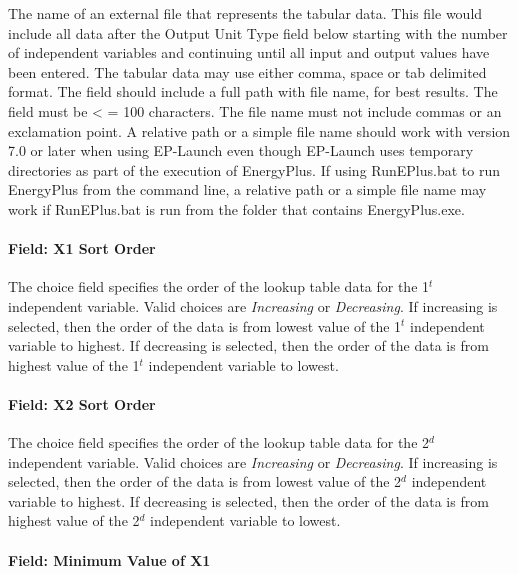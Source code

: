 The name of an external file that represents the tabular data. This file would include all data after the Output Unit Type field below starting with the number of independent variables and continuing until all input and output values have been entered. The tabular data may use either comma, space or tab delimited format. The field should include a full path with file name, for best results. The field must be \textless{} = 100 characters. The file name must not include commas or an exclamation point. A relative path or a simple file name should work with version 7.0 or later when using EP-Launch even though EP-Launch uses temporary directories as part of the execution of EnergyPlus. If using RunEPlus.bat to run EnergyPlus from the command line, a relative path or a simple file name may work if RunEPlus.bat is run from the folder that contains EnergyPlus.exe.

\paragraph{Field: X1 Sort Order}\label{field-x1-sort-order}

The choice field specifies the order of the lookup table data for the 1\(^{t}\) independent variable. Valid choices are \emph{Increasing} or \emph{Decreasing}. If increasing is selected, then the order of the data is from lowest value of the 1\(^{t}\) independent variable to highest. If decreasing is selected, then the order of the data is from highest value of the 1\(^{t}\) independent variable to lowest.

\paragraph{Field: X2 Sort Order}\label{field-x2-sort-order}

The choice field specifies the order of the lookup table data for the 2\(^{d}\) independent variable. Valid choices are \emph{Increasing} or \emph{Decreasing}. If increasing is selected, then the order of the data is from lowest value of the 2\(^{d}\) independent variable to highest. If decreasing is selected, then the order of the data is from highest value of the 2\(^{d}\) independent variable to lowest.

\paragraph{Field: Minimum Value of X1}\label{field-minimum-value-of-x1}

